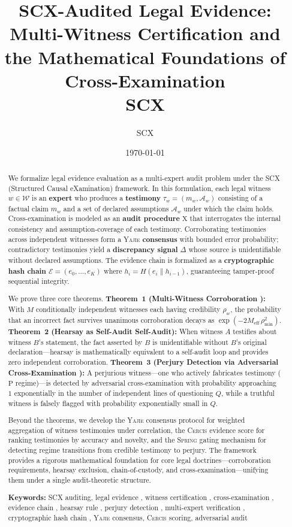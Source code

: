 \documentclass[11pt,a4paper]{article}
\title{\textbf{SCX-Audited Legal Evidence:}\\[4pt]
\large Multi-Witness Certification and the Mathematical Foundations of Cross-Examination\\[6pt]
\small SCX}
\author{SCX}
\date{\today}
\theoremstyle{definition}
\newcommand{\Yajie}{\textsc{Yajie}}
\newcommand{\Spring}{\textsc{Spring}}
\newcommand{\Cercis}{\textsc{Cercis}}
\newcommand{\SCX}{\textsc{SCX}}
\newcommand{\witnessSet}{\mathcal{W}}           %
\newcommand{\evidenceChain}{\mathcal{E}}        %
\newcommand{\hashFunc}{H}                       %
\newcommand{\discrepancy}{\Delta}              %
\newcommand{\crossexam}{\mathrm{X}}             %
\newcommand{\perjury}{\mathrm{P}}               %
\begin{document}
\maketitle

\begin{abstract}
We formalize legal evidence evaluation as a multi-expert audit problem under the \SCX{} (Structured Causal eXamination) framework. In this formulation, each legal witness $w \in \witnessSet$ is an \textbf{expert} who produces a \textbf{testimony} $\tau_w = (m_w, \mathcal{A}_w)$ consisting of a factual claim $m_w$ and a set of declared assumptions $\mathcal{A}_w$ under which the claim holds. Cross-examination is modeled as an \textbf{audit procedure} $\crossexam$ that interrogates the internal consistency and assumption-coverage of each testimony. Corroborating testimonies across independent witnesses form a \Yajie{} \textbf{consensus} with bounded error probability; contradictory testimonies yield a \textbf{discrepancy signal} $\discrepancy$ whose source is unidentifiable without declared assumptions. The evidence chain is formalized as a \textbf{cryptographic hash chain} $\evidenceChain = (e_0, \ldots, e_K)$ where $h_i = \hashFunc(e_i \| h_{i-1})$, guaranteeing tamper-proof sequential integrity.

We prove three core theorems. \textbf{Theorem~1 (Multi-Witness Corroboration ):} With $M$ conditionally independent witnesses each having credibility $\rho_w$, the probability that an incorrect fact survives unanimous corroboration decays as $\exp(-2M_{\mathrm{eff}}\,\rho_{\min}^2)$. \textbf{Theorem~2 (Hearsay as Self-Audit Self-Audit):} When witness $A$ testifies about witness $B$'s statement, the fact asserted by $B$ is unidentifiable without $B$'s original declaration---hearsay is mathematically equivalent to a self-audit loop and provides zero independent corroboration. \textbf{Theorem~3 (Perjury Detection via Adversarial Cross-Examination ):} A perjurious witness---one who actively fabricates testimony ($\perjury$ regime)---is detected by adversarial cross-examination with probability approaching $1$ exponentially in the number of independent lines of questioning $Q$, while a truthful witness is falsely flagged with probability exponentially small in $Q$.

Beyond the theorems, we develop the \Yajie{} consensus protocol for weighted aggregation of witness testimonies under correlation, the \Cercis{} evidence score for ranking testimonies by accuracy and novelty, and the \Spring{} gating mechanism for detecting regime transitions from credible testimony to perjury. The framework provides a rigorous mathematical foundation for core legal doctrines---corroboration requirements, hearsay exclusion, chain-of-custody, and cross-examination---unifying them under a single audit-theoretic structure.

\medskip
\noindent\textbf{Keywords:} SCX auditing, legal evidence , witness certification , cross-examination , evidence chain , hearsay rule , perjury detection , multi-expert verification , cryptographic hash chain , \Yajie{} consensus, \Cercis{} scoring, adversarial audit 
\end{abstract}
\end{document}
